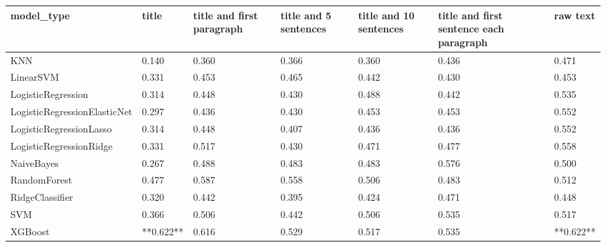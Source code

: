 \begin{tabular}{lllllll}
\toprule
                  model\_type &     title & title and first paragraph & title and 5 sentences & title and 10 sentences & title and first sentence each paragraph &  raw text \\
\midrule
                         KNN &     0.140 &                     0.360 &                 0.366 &                  0.360 &                                   0.436 &     0.471 \\
                   LinearSVM &     0.331 &                     0.453 &                 0.465 &                  0.442 &                                   0.430 &     0.453 \\
          LogisticRegression &     0.314 &                     0.448 &                 0.430 &                  0.488 &                                   0.442 &     0.535 \\
LogisticRegressionElasticNet &     0.297 &                     0.436 &                 0.430 &                  0.453 &                                   0.453 &     0.552 \\
     LogisticRegressionLasso &     0.314 &                     0.448 &                 0.407 &                  0.436 &                                   0.436 &     0.552 \\
     LogisticRegressionRidge &     0.331 &                     0.517 &                 0.430 &                  0.471 &                                   0.477 &     0.558 \\
                  NaiveBayes &     0.267 &                     0.488 &                 0.483 &                  0.483 &                                   0.576 &     0.500 \\
                RandomForest &     0.477 &                     0.587 &                 0.558 &                  0.506 &                                   0.483 &     0.512 \\
             RidgeClassifier &     0.320 &                     0.442 &                 0.395 &                  0.424 &                                   0.471 &     0.448 \\
                         SVM &     0.366 &                     0.506 &                 0.442 &                  0.506 &                                   0.535 &     0.517 \\
                     XGBoost & **0.622** &                     0.616 &                 0.529 &                  0.517 &                                   0.535 & **0.622** \\
\bottomrule
\end{tabular}
